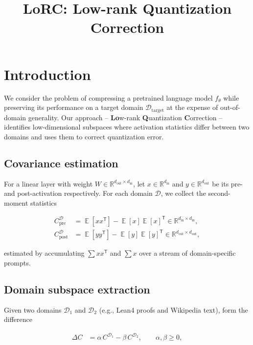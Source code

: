 \documentclass[11pt,a4paper]{article}
\title{LoRC: Low-rank Quantization Correction}
\date{}
\DeclareMathOperator{\E}{\mathbb{E}}
\begin{document}
\maketitle

\section{Introduction}

We consider the problem of compressing a pretrained language model
$f_\theta$ while preserving its performance on a target domain
$\mathcal{D}_{\text{target}}$ at the expense of out-of-domain
generality.  Our approach -- \textbf{Lo}w-rank \textbf{Q}uantization
\textbf{C}orrection -- identifies low-dimensional subspaces where
activation statistics differ between two domains and uses them to
correct quantization error.

\subsection{Covariance estimation}

For a linear layer with weight $W \in \mathbb{R}^{d_{\text{out}} \times
d_{\text{in}}}$, let $x \in \mathbb{R}^{d_{\text{in}}}$ and $y \in
\mathbb{R}^{d_{\text{out}}}$ be its pre- and post-activation
respectively.  For each domain $\mathcal{D}$, we collect the
second-moment statistics

\begin{align}
  C_{\text{pre}}^{\mathcal{D}} &= \E[xx^{\mathsf{T}}] -
  \E[x]\E[x]^{\mathsf{T}} \in \mathbb{R}^{d_{\text{in}} \times
  d_{\text{in}}}, \\
  C_{\text{post}}^{\mathcal{D}} &= \E[yy^{\mathsf{T}}] -
  \E[y]\E[y]^{\mathsf{T}} \in \mathbb{R}^{d_{\text{out}} \times
  d_{\text{out}}},
\end{align}

estimated by accumulating $\sum xx^{\mathsf{T}}$ and $\sum x$ over a
stream of domain-specific prompts.

\subsection{Domain subspace extraction}

Given two domains $\mathcal{D}_1$ and $\mathcal{D}_2$ (e.g., Lean4
proofs and Wikipedia text), form the difference

\begin{align}
  \Delta C &= \alpha\,C^{\mathcal{D}_1} - \beta\,C^{\mathcal{D}_2},
  \qquad \alpha,\beta \ge 0,
\end{align}
\end{document}
